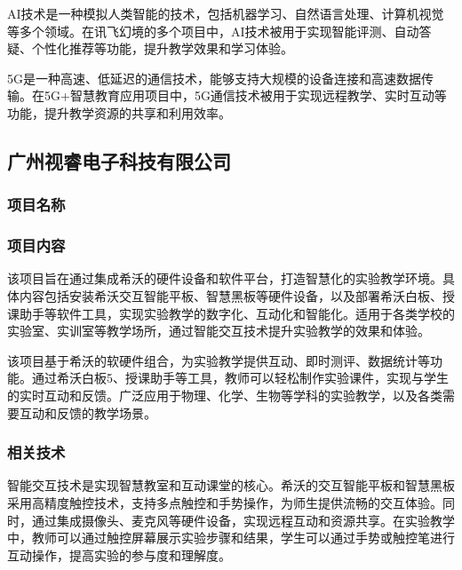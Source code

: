 AI技术是一种模拟人类智能的技术，包括机器学习、自然语言处理、计算机视觉等多个领域。在讯飞幻境的多个项目中，AI技术被用于实现智能评测、自动答疑、个性化推荐等功能，提升教学效果和学习体验。

5G是一种高速、低延迟的通信技术，能够支持大规模的设备连接和高速数据传输。在5G+智慧教育应用项目中，5G通信技术被用于实现远程教学、实时互动等功能，提升教学资源的共享和利用效率。

\subsection{广州视睿电子科技有限公司}

\subsubsection{项目名称}




\subsubsection{项目内容}


该项目旨在通过集成希沃的硬件设备和软件平台，打造智慧化的实验教学环境。具体内容包括安装希沃交互智能平板、智慧黑板等硬件设备，以及部署希沃白板、授课助手等软件工具，实现实验教学的数字化、互动化和智能化。适用于各类学校的实验室、实训室等教学场所，通过智能交互技术提升实验教学的效果和体验。

该项目基于希沃的软硬件组合，为实验教学提供互动、即时测评、数据统计等功能。通过希沃白板5、授课助手等工具，教师可以轻松制作实验课件，实现与学生的实时互动和反馈。广泛应用于物理、化学、生物等学科的实验教学，以及各类需要互动和反馈的教学场景。

\subsubsection{相关技术}


智能交互技术是实现智慧教室和互动课堂的核心。希沃的交互智能平板和智慧黑板采用高精度触控技术，支持多点触控和手势操作，为师生提供流畅的交互体验。同时，通过集成摄像头、麦克风等硬件设备，实现远程互动和资源共享。在实验教学中，教师可以通过触控屏幕展示实验步骤和结果，学生可以通过手势或触控笔进行互动操作，提高实验的参与度和理解度。

